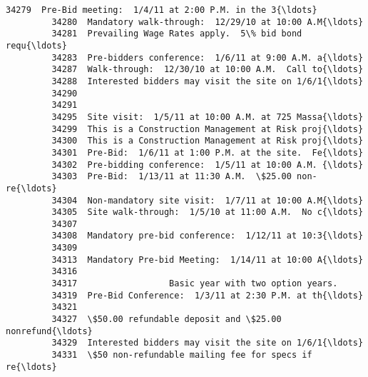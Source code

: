 \documentclass[11pt]{article}
\begin{document}
\begin{Verbatim}[commandchars=\\\{\}]
         34279  Pre-Bid meeting:  1/4/11 at 2:00 P.M. in the 3{\ldots}   
         34280  Mandatory walk-through:  12/29/10 at 10:00 A.M{\ldots}   
         34281  Prevailing Wage Rates apply.  5\% bid bond requ{\ldots}   
         34283  Pre-bidders conference:  1/6/11 at 9:00 A.M. a{\ldots}   
         34287  Walk-through:  12/30/10 at 10:00 A.M.  Call to{\ldots}   
         34288  Interested bidders may visit the site on 1/6/1{\ldots}   
         34290                                                      
         34291                                                      
         34295  Site visit:  1/5/11 at 10:00 A.M. at 725 Massa{\ldots}   
         34299  This is a Construction Management at Risk proj{\ldots}   
         34300  This is a Construction Management at Risk proj{\ldots}   
         34301  Pre-Bid:  1/6/11 at 1:00 P.M. at the site.  Fe{\ldots}   
         34302  Pre-bidding conference:  1/5/11 at 10:00 A.M. {\ldots}   
         34303  Pre-Bid:  1/13/11 at 11:30 A.M.  \$25.00 non-re{\ldots}   
         34304  Non-mandatory site visit:  1/7/11 at 10:00 A.M{\ldots}   
         34305  Site walk-through:  1/5/10 at 11:00 A.M.  No c{\ldots}   
         34307                                                      
         34308  Mandatory pre-bid conference:  1/12/11 at 10:3{\ldots}   
         34309                                                      
         34313  Mandatory Pre-bid Meeting:  1/14/11 at 10:00 A{\ldots}   
         34316                                                      
         34317                  Basic year with two option years.   
         34319  Pre-Bid Conference:  1/3/11 at 2:30 P.M. at th{\ldots}   
         34321                                                      
         34327  \$50.00 refundable deposit and \$25.00 nonrefund{\ldots}   
         34329  Interested bidders may visit the site on 1/6/1{\ldots}   
         34331  \$50 non-refundable mailing fee for specs if re{\ldots}   
         

\end{Verbatim}
\end{document}
